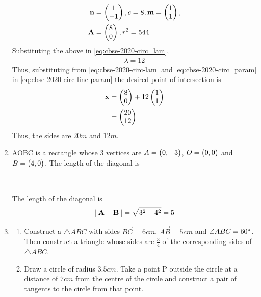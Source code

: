 \documentclass[journal,12pt,twocolumn]{IEEEtran}
\begin{document}
\begin{enumerate}
\begin{align}
			    \label{eq:cbse-2020-circ_param}
			    \mathbf{n} &= \begin{pmatrix}1 \\ -1\end{pmatrix}, c = 8, 
		\mathbf{m} = \begin{pmatrix}1 \\ 1\end{pmatrix}, 
			    \\
			     \mathbf{A} &= \begin{pmatrix}8 \\ 0\end{pmatrix},  r^2 = 544
		    \end{align}
		    Substituting the above in 
			    \eqref{eq:cbse-2020-circ_lam}, 
		    \begin{align}
			    \lambda = 12
			    \label{eq:cbse-2020-circ-lam}
		    \end{align}
		    Thus, substituting from 
			    \eqref{eq:cbse-2020-circ-lam}
			    and 
			    \eqref{eq:cbse-2020-circ_param}
			    in 
			    \eqref{eq:cbse-2020-circ-line-param}
			    the desired point of intersection is 
		    \begin{align}
			    \mathbf{x} &= \begin{pmatrix}8 \\ 0\end{pmatrix} +  12 \begin{pmatrix}1 \\ 1\end{pmatrix}
			    \\
			    &= \begin{pmatrix}20 \\ 12\end{pmatrix}
		    \end{align}
		    Thus, the sides are $20m$ and $12m$.

\item AOBC is a rectangle whose 3 vertices are $A = \begin{pmatrix}0,-3\end{pmatrix}$, $O = \begin{pmatrix}0,0\end{pmatrix}$ and $B = \begin{pmatrix}4,0\end{pmatrix}$. The length of the diagonal is \rule{1.5cm}{0.15mm}\\
\solution
The length of the diagonal is  
  \begin{align}
	  \left\lVert\mathbf{A}-\mathbf{B}\right\rVert = \sqrt{3^2+4^2} = 5
  \end{align}
    \item 
    \begin{enumerate}
    \item Construct a $\triangle ABC$ with sides $\vec{BC}=6cm$, $\vec{AB} = 5cm$ and $\angle{ABC} = 60\degree$. Then construct a triangle whose sides are $\frac{3}{4}$ of the corresponding sides of $\triangle ABC$.\\
    
    \item Draw a circle of radius $3.5 cm$. Take a point P outside the circle at a distance of $7 cm$ from the centre of the circle and construct a pair of tangents to the circle from that point. \\
    \end{enumerate}
    

\end{enumerate}
\end{document}
